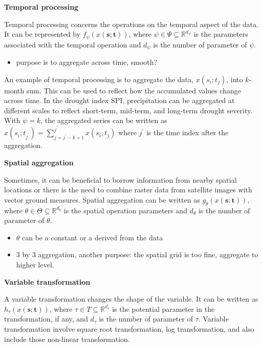 \documentclass[
  letterpaper,
  DIV=11,
  numbers=noendperiod]{scrartcl}
\providecommand{\tightlist}{%
  \setlength{\itemsep}{0pt}\setlength{\parskip}{0pt}}\usepackage{longtable,booktabs,array}
\begin{document}
\textbf{Temporal processing}

Temporal processing concerns the operations on the temporal aspect of
the data. It can be represented by
\(f_{\mathcal{\psi}}(x(\mathbf{s};\mathbf{t}))\), where
\(\psi \in \Psi \subseteq \mathbb{R}^{d_{\psi}}\) is the parameters
associated with the temporal operation and \(d_{\psi}\) is the number of
parameter of \(\psi\).

\begin{itemize}
\tightlist
\item
  purpose is to aggregate across time, smooth?
\end{itemize}

An example of temporal processing is to aggregate the data,
\(x(s_i; t_j)\), into \(k\)-month sum. This can be used to reflect how
the accumulated values change across time. In the drought index SPI,
precipitation can be aggregated at different scales to reflect
short-term, mid-term, and long-term drought severity. With \(\psi = k\),
the aggregated series can be written as
\(x(s_i;t_{j^\prime}) = \sum_{j = j^\prime-k+1}^{j^\prime}x(s_i; t_j)\)
where \(j^\prime\) is the time index after the aggregation.

\textbf{Spatial aggregation}

Sometimes, it can be beneficial to borrow information from nearby
spatial locations or there is the need to combine raster data from
satellite images with vector ground measures. Spatial aggregation can be
written as \(g_{\mathcal{\theta}}(x(\mathbf{s};\mathbf{t}))\), where
\(\theta \in \Theta \subseteq \mathbb{R}^{d_{\theta}}\) is the spatial
operation parameters and \(d_{\theta}\) is the number of parameter of
\(\theta\).

\begin{itemize}
\item
  \(\theta\) can be a constant or a derived from the data
\item
  3 by 3 aggregation, another purpose: the spatial grid is too fine,
  aggregate to higher level.
\end{itemize}

\textbf{Variable transformation}

A variable transformation changes the shape of the variable. It can be
written as \(h_{\tau}(x(\mathbf{s};\mathbf{t}))\), where
\(\tau \in T \subseteq \mathbb{R}^{d_{\tau}}\) is the potential
parameter in the transformation, if any, and \(d_{\tau}\) is the number
of parameter of \(\tau\). Variable transformation involve square root
transformation, log transformation, and also include those non-linear
transformation.
\end{document}
